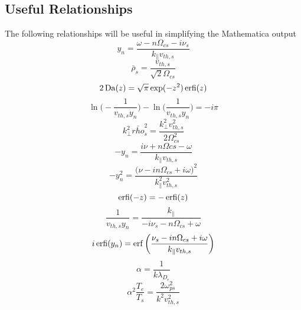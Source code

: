 \subsection{Useful Relationships}
The following relationships will be useful in simplifying the Mathematica output
\begin{equation}
	y_n = \frac{\omega - n \Omega_{cs}- i \nu_s}{k_\parallel v_{th,s}}
	\label{eq:a_yn}
\end{equation}
\begin{equation}
	\bar{\rho}_s = \frac{v_{th,s}}{\sqrt{2} \Omega_{cs}}
	\label{eq:a_rho}
\end{equation}
\begin{equation}
	2 \operatorname{Da}(z) = \sqrt{\pi} \exp(-z^2) \operatorname{erfi}(z)
	\label{eq:a_Daw}
\end{equation}
\begin{equation}
	\ln\bigg( -\frac{1}{v_{th,s}y_n} \bigg) - \ln\bigg( \frac{1}{v_{th,s}y_n} \bigg) = -i \pi
	\label{eq:a_ln}
\end{equation}
\begin{equation}
	k_\perp^2 \bar{rho}_s^2 = \frac{k_\perp^2 v_{th,s}^2}{2\Omega_{cs}^2}
	\label{eq:a_k2rho2}
\end{equation}
\begin{equation}
	-y_n = \frac{i\nu + n\Omega{cs}-\omega}{k_\parallel v_{th,s}}
	\label{eq:a_-yn}
\end{equation}
\begin{equation}
	-y_n^2 = \frac{\big(\nu-in\Omega_{cs}+i\omega\big)^2}{k_\parallel^2 v_{th,s}^2}
	\label{eq:a_-yn2}
\end{equation}
\begin{equation}
	\operatorname{erfi}(-z) = -\operatorname{erfi}(z) 
	\label{eq:a_erfi_odd}
\end{equation}
\begin{equation}
	\frac{1}{v_{th,s}y_n} = \frac{k_\parallel}{-i\nu_s-n\Omega_{cs}+\omega}
	\label{eq:a_vthyn}
\end{equation}
\begin{equation}
	i \operatorname{erfi}(y_n) = \operatorname{erf} \bigg( \frac{\nu_s - i n\Omega_{cs} + i \omega}{k_\parallel v_{th,s}}  \bigg)
	\label{eq:a_erfiyn}
\end{equation}
\begin{equation}
	\alpha = \frac{1}{k \lambda_{D_e}}
	\label{eq:a_alpha}
\end{equation}
\begin{equation}
	\alpha^2 \frac{T_e}{T_s} = \frac{2 \omega_{ps}^2}{k^2 v_{th,s}^2}
	\label{eq:a_alpha2}
\end{equation}

